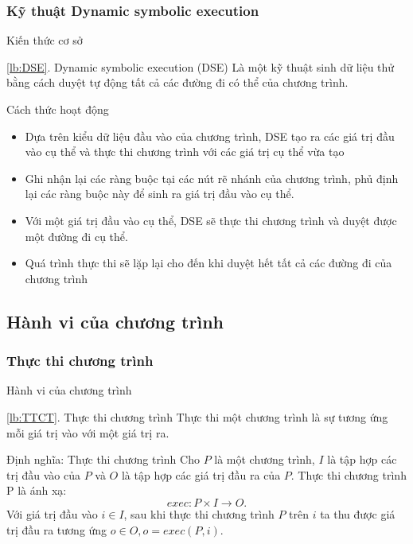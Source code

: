 \subsubsection*{Kỹ thuật Dynamic symbolic execution}
\label{lb:DSE}
\begin{frame}{Kiến thức cơ sở}
\begin{block}{\ref{lb:DSE}. Dynamic symbolic execution (DSE)}
Là một kỹ thuật sinh dữ liệu thử bằng cách duyệt tự động tất cả các đường đi 
có thể của chương trình.
\end{block} \pause
\begin{block}{Cách thức hoạt động}
\begin{itemize}
	\item Dựa trên kiểu dữ liệu đầu vào của chương trình, DSE tạo ra các giá
	trị đầu vào cụ thể và thực thi chương trình với các giá trị cụ thể vừa tạo \pause
	\item Ghi nhận lại các ràng buộc tại các nút rẽ nhánh của chương trình, 
	phủ định lại các ràng buộc này để sinh ra giá trị đầu vào cụ thể.\pause
	\item Với một giá trị đầu vào cụ thể, DSE sẽ thực thi chương trình và 
	duyệt được một đường đi cụ thể.\pause
	\item Quá trình thực thi sẽ lặp lại cho đến khi duyệt hết tất cả các
	đường đi của chương trình
\end{itemize}	


\end{block}
\end{frame}

\subsection{Hành vi của chương trình}
\subsubsection*{Thực thi chương trình}
\label{lb:TTCT}
\begin{frame}{Hành vi của chương trình}
\begin{block}{\ref{lb:TTCT}. Thực thi chương trình}
Thực thi một chương trình là sự tương ứng mỗi giá trị vào với một giá trị ra.
\end{block}

\begin{exampleblock}{Định nghĩa: Thực thi chương trình}
Cho $P$ là một chương trình, $I$ là tập hợp các trị đầu vào của $P$
và $O$ là tập hợp các giá trị đầu ra của $P$. Thực thi chương trình
P là ánh xạ:
\[exec: P \times I \rightarrow O.\]
Với giá trị đầu vào $i \in I$, sau khi thực thi chương trình $P$ trên
$i$ ta thu được giá trị đầu ra tương ứng $o \in O, o = exec(P, i)$.
\end{exampleblock}
\end{frame}

